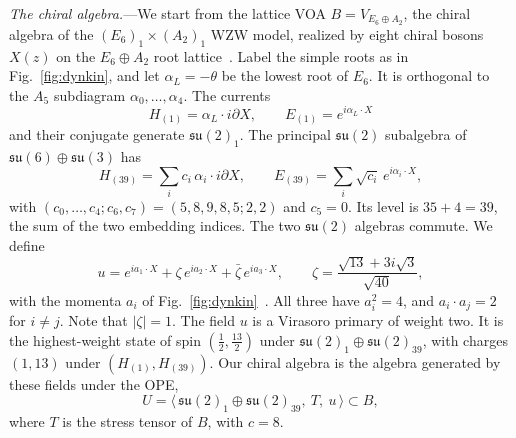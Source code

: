 \documentclass[aps,prl,twocolumn,superscriptaddress,nofootinbib]{revtex4-2}
\newcommand{\su}{\mathfrak{su}}
\begin{document}
\textit{The chiral algebra.}---We start from the lattice VOA
$B=V_{E_6\oplus A_2}$, the chiral algebra of the $(E_6)_1\times(A_2)_1$
WZW model, realized by eight chiral bosons $X(z)$ on the $E_6\oplus A_2$
root lattice~\cite{FK,FLM}. Label the simple roots as in
Fig.~\ref{fig:dynkin}, and let $\alpha_L=-\theta$ be the lowest root of
$E_6$. It is orthogonal to the $A_5$ subdiagram
$\alpha_0,\dots,\alpha_4$. The currents
\begin{equation}
 H_{(1)}=\alpha_L\cdot i\partial X,\qquad
 E_{(1)}=e^{i\alpha_L\cdot X}
 \label{eq:su21}
\end{equation}
and their conjugate generate $\su(2)_1$. The principal $\su(2)$
subalgebra of $\su(6)\oplus\su(3)$ has
\begin{equation}
 H_{(39)}=\sum_i c_i\,\alpha_i\cdot i\partial X,\qquad
 E_{(39)}=\sum_i\sqrt{c_i}\,e^{i\alpha_i\cdot X},
 \label{eq:su239}
\end{equation}
with $(c_0,\dots,c_4;c_6,c_7)=(5,8,9,8,5;2,2)$ and $c_5=0$. Its level is
$35+4=39$, the sum of the two embedding indices. The two $\su(2)$
algebras commute. We define
\begin{equation}
 u=e^{ia_1\cdot X}+\zeta\,e^{ia_2\cdot X}+\bar\zeta\,e^{ia_3\cdot X},
 \qquad
 \zeta=\frac{\sqrt{13}+3i\sqrt3}{\sqrt{40}},
 \label{eq:u}
\end{equation}
with the momenta $a_i$ of Fig.~\ref{fig:dynkin}~\cite{note-cocycle}.
All three have $a_i^2=4$, and $a_i\cdot a_j=2$ for $i\ne j$. Note that
$|\zeta|=1$. The field $u$ is a Virasoro primary of weight two. It is
the highest-weight state of spin $(\tfrac12,\tfrac{13}2)$ under
$\su(2)_1\oplus\su(2)_{39}$, with charges $(1,13)$ under
$(H_{(1)},H_{(39)})$. Our chiral algebra is the algebra generated by
these fields under the OPE,
\begin{equation}
 U=\bigl\langle\,\su(2)_1\oplus\su(2)_{39},\ T,\ u\,\bigr\rangle\subset B,
 \label{eq:U}
\end{equation}
where $T$ is the stress tensor of $B$, with $c=8$.
\end{document}
